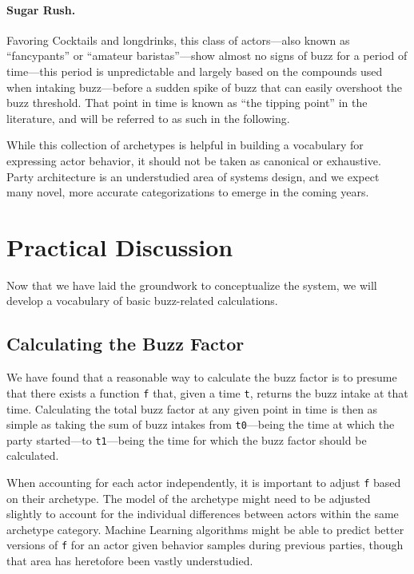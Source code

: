 \documentclass[twocolumn]{article}
\begin{document}
\paragraph{Sugar Rush.} Favoring Cocktails and longdrinks, this class of
actors—also known as “fancypants” or “amateur baristas”—show almost no signs of
buzz for a period of time—this period is unpredictable and largely based on the
compounds used when intaking buzz—before a sudden spike of buzz that can easily
overshoot the buzz threshold. That point in time is known as “the tipping point”
in the literature, and will be referred to as such in the following.

\bigskip

While this collection of archetypes is helpful in building a vocabulary for
expressing actor behavior, it should not be taken as canonical or exhaustive.
Party architecture is an understudied area of systems design, and we expect many
novel, more accurate categorizations to emerge in the coming years.

\section{Practical Discussion}

Now that we have laid the groundwork to conceptualize the system, we will
develop a vocabulary of basic buzz-related calculations.

\subsection{Calculating the Buzz Factor}

We have found that a reasonable way to calculate the buzz factor is to presume
that there exists a function \texttt{f} that, given a time \texttt{t}, returns
the buzz intake at that time. Calculating the total buzz factor at any given
point in time is then as simple as taking the sum of buzz intakes from
\texttt{t0}—being the time at which the party started—to \texttt{t1}—being the
time for which the buzz factor should be calculated.

When accounting for each actor independently, it is important to adjust \texttt{f} based on their archetype. The model of the archetype might need to
be adjusted slightly to account for the individual differences between actors
within the same archetype category. Machine Learning algorithms might be able
to predict better versions of \texttt{f} for an actor given behavior samples
during previous parties, though that area has heretofore been vastly
understudied.
\end{document}
